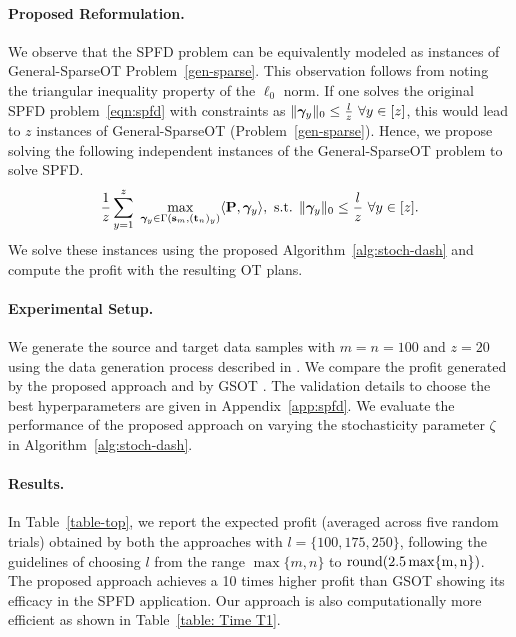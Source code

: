 \paragraph{Proposed Reformulation.} We observe that the SPFD problem can be equivalently modeled as instances of General-SparseOT Problem~\ref{gen-sparse}. This observation follows from noting the triangular inequality property of the $\ell_0$ norm. If one solves the original SPFD problem~\ref{eqn:spfd} with constraints as $\|\bm{\gamma}_y\|_0\leq \frac{l}{z}\ \forall y\in [z]$, this would lead to $z$ instances of General-SparseOT (Problem~\ref{gen-sparse}). Hence, we propose solving the following independent instances of the General-SparseOT problem to solve SPFD.
\begin{equation}\label{eqn:proposed_spfd}
\frac{1}{z}\sum_{y=1}^z\ \max\limits_{\bm{\gamma}_y\in \Gamma(\mathbf{s}_m, (\mathbf{t}_n)_y)}\langle\mathbf{P}, \bm{\gamma}_y\rangle,\ \textup{s.t. }\|\bm{\gamma}_y\|_0\leq \frac{l}{z} \ \forall y\in[z].
\end{equation}
We solve these instances using the proposed Algorithm~\ref{alg:stoch-dash} and compute the profit with the resulting OT plans.

\paragraph{Experimental Setup.} We generate the source and target data samples with $m=n=100$ and $z=20$ using the data generation process described in \citet{ijcai2023p679}. 
We compare the profit generated by the proposed approach and by GSOT \citep{liu2023sparsityconstrained}.
The validation details to choose the best hyperparameters are given in Appendix~\ref{app:spfd}. We evaluate the performance of the proposed approach on varying the stochasticity parameter $\zeta$ in Algorithm~\ref{alg:stoch-dash}. 

\paragraph{Results.}
In Table~\ref{table-top}, we report the expected profit (averaged across five random trials) obtained by both the approaches with $l=\{100,175,250\}$, following the guidelines of choosing $l$ from the range $\max\{m, n\}$ to $\rm{round}(2.5\max\{m, n\})$.
The proposed approach achieves a 10 times higher profit than GSOT showing its efficacy in the SPFD application. Our approach is also computationally more efficient as shown in Table~\ref{table: Time T1}.

